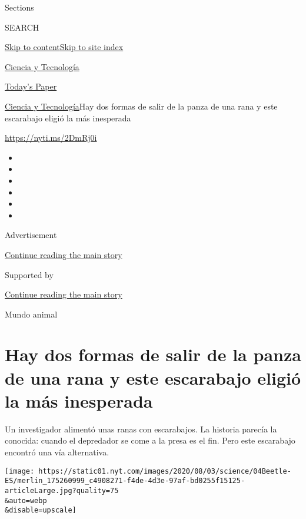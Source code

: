 Sections

SEARCH

\protect\hyperlink{site-content}{Skip to
content}\protect\hyperlink{site-index}{Skip to site index}

\href{https://www.nytimes.com/es/section/ciencia-y-tecnologia}{Ciencia y
Tecnología}

\href{https://myaccount.nytimes.com/auth/login?response_type=cookie\&client_id=vi}{}

\href{https://www.nytimes.com/section/todayspaper}{Today's Paper}

\href{/es/section/ciencia-y-tecnologia}{Ciencia y
Tecnología}\textbar{}Hay dos formas de salir de la panza de una rana y
este escarabajo eligió la más inesperada

\url{https://nyti.ms/2DmRj0i}

\begin{itemize}
\item
\item
\item
\item
\item
\item
\end{itemize}

Advertisement

\protect\hyperlink{after-top}{Continue reading the main story}

Supported by

\protect\hyperlink{after-sponsor}{Continue reading the main story}

Mundo animal

\hypertarget{hay-dos-formas-de-salir-de-la-panza-de-una-rana-y-este-escarabajo-eligiuxf3-la-muxe1s-inesperada}{%
\section{Hay dos formas de salir de la panza de una rana y este
escarabajo eligió la más
inesperada}\label{hay-dos-formas-de-salir-de-la-panza-de-una-rana-y-este-escarabajo-eligiuxf3-la-muxe1s-inesperada}}

Un investigador alimentó unas ranas con escarabajos. La historia parecía
la conocida: cuando el depredador se come a la presa es el fin. Pero
este escarabajo encontró una vía alternativa.

\texttt{[image: https://static01.nyt.com/images/2020/08/03/science/04Beetle-ES/merlin\_175260999\_c4908271-f4de-4d3e-97af-bd0255f15125-articleLarge.jpg?quality=75\\\&auto=webp\\\&disable=upscale]}

